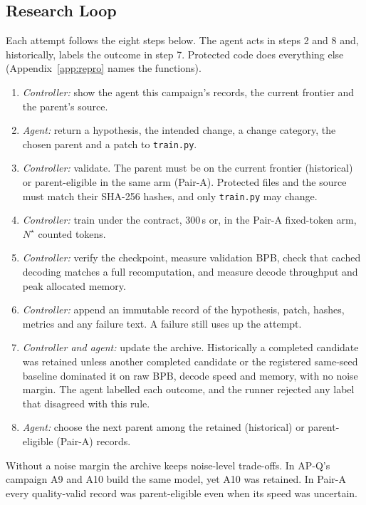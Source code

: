 \documentclass{article}
\newif\ifshowhumanmarkers \showhumanmarkersfalse
\newcommand{\humantag}[1]{{\color{humanframe}\sffamily\scriptsize\bfseries HUMAN AUTHOR MUST REWRITE/VERIFY [#1]}\ }
\newcommand{\humanauthor}[2][]{\ifshowhumanmarkers\begin{humanbox}\humantag{#1}#2\end{humanbox}\else #2\par\fi}
\begin{document}
\subsection{Research Loop}\label{sec:loop}
\humanauthor[P2-04 r6]{Each attempt follows the eight steps below. The agent acts in steps 2 and 8 and, historically, labels the outcome in step 7. Protected code does everything else (Appendix~\ref{app:repro} names the functions).
{\small\begin{enumerate}\setlength{\itemsep}{0pt}\setlength{\parskip}{0pt}\setlength{\topsep}{2pt}
\item \emph{Controller:} show the agent this campaign's records, the current frontier and the parent's source.
\item \emph{Agent:} return a hypothesis, the intended change, a change category, the chosen parent and a patch to \texttt{train.py}.
\item \emph{Controller:} validate. The parent must be on the current frontier (historical) or parent-eligible in the same arm (Pair-A). Protected files and the source must match their SHA-256 hashes, and only \texttt{train.py} may change.
\item \emph{Controller:} train under the contract, 300\,s or, in the Pair-A fixed-token arm, $N^\star$ counted tokens.
\item \emph{Controller:} verify the checkpoint, measure validation BPB, check that cached decoding matches a full recomputation, and measure decode throughput and peak allocated memory.
\item \emph{Controller:} append an immutable record of the hypothesis, patch, hashes, metrics and any failure text. A failure still uses up the attempt.
\item \emph{Controller and agent:} update the archive. Historically a completed candidate was retained unless another completed candidate or the registered same-seed baseline dominated it on raw BPB, decode speed and memory, with no noise margin. The agent labelled each outcome, and the runner rejected any label that disagreed with this rule.
\item \emph{Agent:} choose the next parent among the retained (historical) or parent-eligible (Pair-A) records.
\end{enumerate}}
Without a noise margin the archive keeps noise-level trade-offs. In AP-Q's campaign A9 and A10 build the same model, yet A10 was retained. In Pair-A every quality-valid record was parent-eligible even when its speed was uncertain.}
\end{document}
